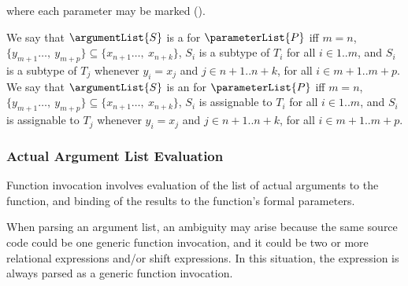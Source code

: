 \documentclass[makeidx]{article}
\begin{document}
{\noindent
where each parameter may be marked \COVARIANT{}
().

\LMHash{}%
We say that $\argumentList{S}$ is
a  for $\parameterList{P}$
if{}f $m = n$,
$\{y_{m+1}\ldots,\ y_{m+p}\} \subseteq \{x_{n+1}\ldots,\ x_{n+k}\}$,
$S_i$ is a subtype of $T_i$ for all $i \in 1 .. m$,
and $S_i$ is a subtype of $T_j$ whenever $y_i = x_j$ and
$j \in n + 1 .. n + k$, for all
$i \in m + 1 .. m + p$.
We say that $\argumentList{S}$
is an  for $\parameterList{P}$
if{}f $m = n$,
$\{y_{m+1}\ldots,\ y_{m+p}\} \subseteq \{x_{n+1}\ldots,\ x_{n+k}\}$,
$S_i$ is assignable to $T_i$ for all $i \in 1 .. m$,
and $S_i$ is assignable to $T_j$ whenever $y_i = x_j$ and
$j \in n + 1 .. n + k$, for all
$i \in m + 1 .. m + p$.



\subsubsection{Actual Argument List Evaluation}

\LMHash{}%
Function invocation involves evaluation of the list of actual arguments to the function,
and binding of the results to the function's formal parameters.

\LMHash{}%
When parsing an argument list, an ambiguity may arise because the same source code could be one generic function invocation,
and it could be two or more relational expressions and/or shift expressions.
In this situation, the expression is always parsed as a generic function invocation.



}
\end{document}
